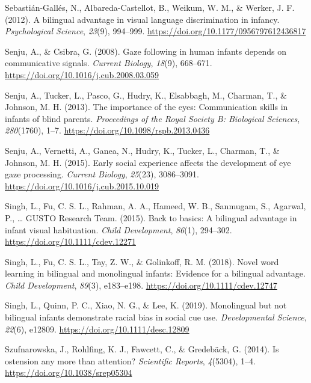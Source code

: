\documentclass[english,,man,floatsintext]{apa6}
\begin{document}
\leavevmode\hypertarget{ref-Sebastian-Galles_etal_2012}{}%
Sebastián-Gallés, N., Albareda-Castellot, B., Weikum, W. M., \& Werker, J. F. (2012). A bilingual advantage in visual language discrimination in infancy. \emph{Psychological Science}, \emph{23}(9), 994--999. \url{https://doi.org/10.1177/0956797612436817}

\leavevmode\hypertarget{ref-Senju_Csibra_2008}{}%
Senju, A., \& Csibra, G. (2008). Gaze following in human infants depends on communicative signals. \emph{Current Biology}, \emph{18}(9), 668--671. \url{https://doi.org/10.1016/j.cub.2008.03.059}

\leavevmode\hypertarget{ref-Senju_etal_2013}{}%
Senju, A., Tucker, L., Pasco, G., Hudry, K., Elsabbagh, M., Charman, T., \& Johnson, M. H. (2013). The importance of the eyes: Communication skills in infants of blind parents. \emph{Proceedings of the Royal Society B: Biological Sciences}, \emph{280}(1760), 1--7. \url{https://doi.org/10.1098/rspb.2013.0436}

\leavevmode\hypertarget{ref-Senju_etal_2015}{}%
Senju, A., Vernetti, A., Ganea, N., Hudry, K., Tucker, L., Charman, T., \& Johnson, M. H. (2015). Early social experience affects the development of eye gaze processing. \emph{Current Biology}, \emph{25}(23), 3086--3091. \url{https://doi.org/10.1016/j.cub.2015.10.019}

\leavevmode\hypertarget{ref-Singh_etal_2015}{}%
Singh, L., Fu, C. S. L., Rahman, A. A., Hameed, W. B., Sanmugam, S., Agarwal, P., \ldots{} GUSTO Research Team. (2015). Back to basics: A bilingual advantage in infant visual habituation. \emph{Child Development}, \emph{86}(1), 294--302. \url{https://doi.org/10.1111/cdev.12271}

\leavevmode\hypertarget{ref-Singh_etal_2018}{}%
Singh, L., Fu, C. S. L., Tay, Z. W., \& Golinkoff, R. M. (2018). Novel word learning in bilingual and monolingual infants: Evidence for a bilingual advantage. \emph{Child Development}, \emph{89}(3), e183--e198. \url{https://doi.org/10.1111/cdev.12747}

\leavevmode\hypertarget{ref-Singh_etal_2019}{}%
Singh, L., Quinn, P. C., Xiao, N. G., \& Lee, K. (2019). Monolingual but not bilingual infants demonstrate racial bias in social cue use. \emph{Developmental Science}, \emph{22}(6), e12809. \url{https://doi.org/10.1111/desc.12809}

\leavevmode\hypertarget{ref-Szufnarowska_etal_2014}{}%
Szufnarowska, J., Rohlfing, K. J., Fawcett, C., \& Gredebäck, G. (2014). Is ostension any more than attention? \emph{Scientific Reports}, \emph{4}(5304), 1--4. \url{https://doi.org/10.1038/srep05304}
\end{document}
